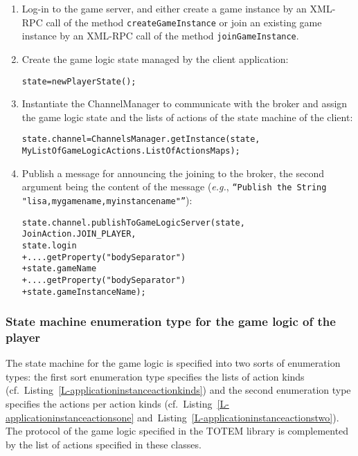 \begin{enumerate}

\item Log-in to the game server, and either create a game instance by an 
XML-RPC call of the method \texttt{createGameInstance} or join an existing game
instance by an XML-RPC call of the method \texttt{joinGameInstance}.
\item Create the game logic state managed by the client application:
\begin{small}
\begin{alltt}
state = new PlayerState();
\end{alltt}
\end{small}
\item Instantiate the ChannelManager to communicate with the broker and
assign the game logic state and the lists of actions of
  the state machine of the client:
\begin{small}
\begin{alltt}
state.channel = ChannelsManager.getInstance(state,
                                                MyListOfGameLogicActions.ListOfActionsMaps);
\end{alltt}
\end{small}
\item Publish a message for announcing the joining to
  the broker, the second argument being the content
  of the message (\emph{e.g.}, \texttt{``Publish the String "lisa,mygamename,myinstancename"''}):
\begin{small}
\begin{alltt}
state.channel.publishToGameLogicServer(state,
                                       JoinAction.JOIN\_PLAYER,
                                       state.login
                                       + ....getProperty("bodySeparator")
                                       + state.gameName
                                       + ....getProperty("bodySeparator")
                                       + state.gameInstanceName);
\end{alltt}
\end{small}
\end{enumerate}

\subsubsection{State machine enumeration type for the game logic of the player}

The state machine for the game logic is specified into two sorts of
enumeration types: the first sort enumeration type specifies the
lists of action kinds
(cf.~Listing~\ref{L-applicationinstanceactionkinds}) and the second
enumeration type specifies the actions per action kinds
(cf.~Listing~\ref{L-applicationinstanceactionsone}
and~Listing~\ref{L-applicationinstanceactionstwo}). The protocol of the game 
logic specified in the TOTEM library is complemented by the list of actions 
specified in these classes.

